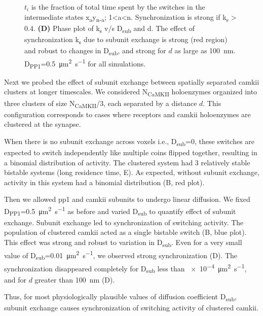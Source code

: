 \documentclass[9pt,lineno,doublespacing]{elife}
\newcommand\SUB[2]{#1\textsubscript{#2}}
\begin{document}
\begin{figure}
{        $t_i$ is the fraction of total time spent by the switches in the 
        intermediate states x\textsubscript{a}y\textsubscript{n-a}; 1\textless{}a\textless{}n.
        Synchronization is strong if k\textsubscript{s} \textgreater{} 0.4.
        \textbf{(D)} Phase plot of \SUB{k}{s} v/s \SUB{D}{sub} and d. The effect
        of synchronization \SUB{k}{s} due to subunit exchange is strong (red
        region) and robust to changes in \SUB{D}{sub}, and strong for $d$ as large as
        \SI{100}{\nano\meter}. \SUB{D}{PP1}=\SI{0.5}{\micro\meter\squared\per\second}
        for all simulations.}\label{fig:sync_spread}
\end{figure}

Next we probed the effect of subunit exchange between spatially separated
\gls{camkii} clusters at longer timescales. We considered \SUB{N}{CaMKII}
holoenzymes organized into three clusters of size \SUB{N}{CaMKII}/3, each
separated by a distance \(d\). This configuration corresponds to cases where
receptors and \gls{camkii} holoenzymes are clustered at the synapse. 

When there is no subunit exchange across voxels i.e., \SUB{D}{sub}=0, these
switches are expected to switch independently like multiple coins flipped
together, resulting in a binomial distribution of activity. The clustered system
had 3 relatively stable bistable systems (long residence time,
E). As expected, without subunit exchange, activity in this
system had a binomial distribution (B, red plot). 

Then we allowed \gls{pp1} and \gls{camkii} subunits to undergo linear diffusion.
We fixed \SUB{D}{PP1}=\SI{0.5}{\micro\meter\squared\per\second} as before and
varied \SUB{D}{sub} to quantify effect of subunit exchange.  Subunit exchange
led to synchronization of switching activity. The population of clustered
\gls{camkii} acted as a single bistable switch (B, blue plot).
This effect was strong and robust to variation in \SUB{D}{sub}. Even for a very
small value of \SUB{D}{sub}=\SI{0.01}{\micro\meter\squared\per\second}, we
observed strong synchronization (D). The synchronization
disappeared completely for \SUB{D}{sub} less than
\SI{e-4}{\micro\meter\squared\per\second}, and  for $d$ greater than
\SI{100}{\nano\meter} (D).

Thus, for most physiologically plausible values of diffusion coefficient
\SUB{D}{sub}, subunit exchange causes synchronization of switching activity of
clustered \gls{camkii}.
\end{document}

